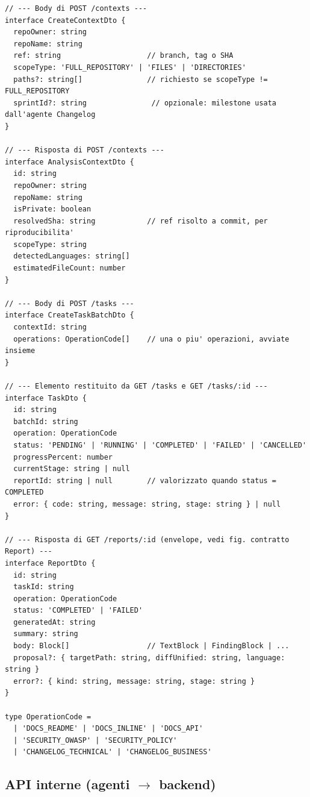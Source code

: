 \documentclass[11pt,a4paper]{article}
\begin{document}
\begin{lstlisting}[caption={Schemi dei DTO che il frontend consuma e produce. I tipi sono condivisi tra backend e frontend riusando le stesse definizioni TypeScript.}]
// --- Body di POST /contexts ---
interface CreateContextDto {
  repoOwner: string
  repoName: string
  ref: string                    // branch, tag o SHA
  scopeType: 'FULL_REPOSITORY' | 'FILES' | 'DIRECTORIES'
  paths?: string[]               // richiesto se scopeType != FULL_REPOSITORY
  sprintId?: string               // opzionale: milestone usata dall'agente Changelog
}

// --- Risposta di POST /contexts ---
interface AnalysisContextDto {
  id: string
  repoOwner: string
  repoName: string
  isPrivate: boolean
  resolvedSha: string            // ref risolto a commit, per riproducibilita'
  scopeType: string
  detectedLanguages: string[]
  estimatedFileCount: number
}

// --- Body di POST /tasks ---
interface CreateTaskBatchDto {
  contextId: string
  operations: OperationCode[]    // una o piu' operazioni, avviate insieme
}

// --- Elemento restituito da GET /tasks e GET /tasks/:id ---
interface TaskDto {
  id: string
  batchId: string
  operation: OperationCode
  status: 'PENDING' | 'RUNNING' | 'COMPLETED' | 'FAILED' | 'CANCELLED'
  progressPercent: number
  currentStage: string | null
  reportId: string | null        // valorizzato quando status = COMPLETED
  error: { code: string, message: string, stage: string } | null
}

// --- Risposta di GET /reports/:id (envelope, vedi fig. contratto Report) ---
interface ReportDto {
  id: string
  taskId: string
  operation: OperationCode
  status: 'COMPLETED' | 'FAILED'
  generatedAt: string
  summary: string
  body: Block[]                  // TextBlock | FindingBlock | ...
  proposal?: { targetPath: string, diffUnified: string, language: string }
  error?: { kind: string, message: string, stage: string }
}

type OperationCode =
  | 'DOCS_README' | 'DOCS_INLINE' | 'DOCS_API'
  | 'SECURITY_OWASP' | 'SECURITY_POLICY'
  | 'CHANGELOG_TECHNICAL' | 'CHANGELOG_BUSINESS'
\end{lstlisting}

\subsection{API interne (agenti $\to$ backend)}
\end{document}
